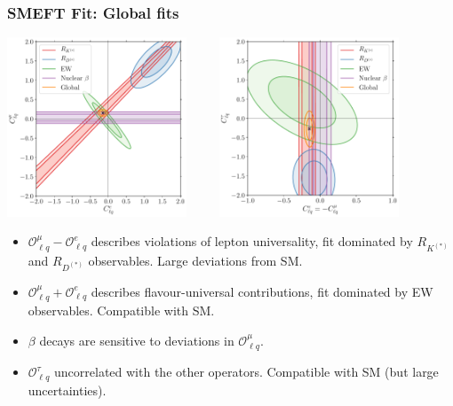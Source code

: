 \documentclass[mathserif, 10pt]{beamer}
\begin{document}
\begin{frame}\frametitle{SMEFT Fit: Global fits}
    \begin{center}
        \includegraphics[width=0.4\textwidth]{figures/scIV_beta.pdf} $\qquad$
        \includegraphics[width=0.4\textwidth]{figures/scXI_beta.pdf}
    \end{center}
    \begin{itemize}
        \item $\mathcal{O}_{\ell q}^\mu - \mathcal{O}_{\ell q}^e$ describes violations of lepton universality, fit dominated by $R_{K^{(*)}}$ and $R_{D^{(*)}}$ observables. Large deviations from SM.
        \item $\mathcal{O}_{\ell q}^\mu + \mathcal{O}_{\ell q}^e$ describes flavour-universal contributions, fit dominated by EW observables. Compatible with SM.
        \item $\beta$ decays are sensitive to deviations in $\mathcal{O}_{\ell q}^\mu$.
        \item $\mathcal{O}_{\ell q}^\tau$ uncorrelated with the other operators. Compatible with SM (but large uncertainties).
    \end{itemize}

\end{frame}
\end{document}

